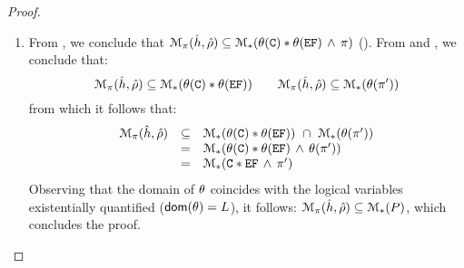 \begin{proof}
\begin{enumerate}
\item From , we conclude that $\mathcal{M}_{\pi}(\hat{h}, \hat\rho) \subseteq \mathcal{M}_{*}(\theta(\mathtt{C}) \mathbin{*} \theta(\mathtt{EF}) \, \wedge \, \pi)$ (). 
From  and , we conclude that: 
$$
  \mathcal{M}_{\pi}(\hat{h}, \hat\rho) \subseteq \mathcal{M}_{*}(\theta(\mathtt{C}) \mathbin{*} \theta(\mathtt{EF}))  
  \qquad 
   \mathcal{M}_{\pi}(\hat{h}, \hat\rho) \subseteq \mathcal{M}_{*}(\theta(\pi'))  
$$
from which it follows that: 
$$ 
 \begin{array}{lcl}
  \mathcal{M}_{\pi}(\hat{h}, \hat\rho) 
           & \subseteq & 
             \mathcal{M}_{*}(\theta(\mathtt{C}) \mathbin{*} \theta(\mathtt{EF})) \ \cap \ \mathcal{M}_{*}(\theta(\pi'))  \\
           & =  &
             \mathcal{M}_{*}(\theta(\mathtt{C}) \mathbin{*} \theta(\mathtt{EF}) \, \wedge \, \theta(\pi')) \\
           & =  & \mathcal{M}_{*}(\mathtt{C} \mathbin{*} \mathtt{EF} \, \wedge \, \pi')
 \end{array}
$$ 
Observing that the domain of $\theta$ coincides with the logical variables existentially quantified ($\mathsf{dom}(\theta) = L$), 
it follows: $\mathcal{M}_{\pi}(\hat{h}, \hat\rho)  \subseteq \mathcal{M}_{*}(P)$, which concludes the proof. 
\end{enumerate}
\end{proof}


